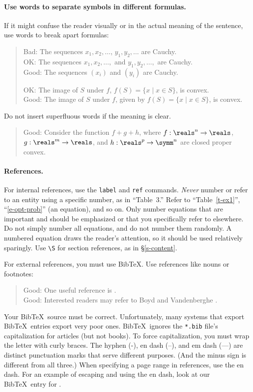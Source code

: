 \documentclass[12pt]{article}
\begin{document}
\paragraph{Use words to separate symbols in different formulas.}
If it might confuse the reader visually or in the actual
meaning of the sentence, use words to break apart formulas:
\begin{quote}
Bad: The sequences $x_1, x_2, \dots$, $y_1, y_2, \dots$ are Cauchy. \\
OK: The sequences $x_1, x_2, \dots,$ and $y_1, y_2, \dots,$ are Cauchy. \\
Good: The sequences $(x_i)$ and $(y_i)$ are Cauchy.

OK: The image of $S$ under $f$, $f(S) = \{ x \mid x \in S \}$, is convex. \\
Good: The image of $S$ under $f$, given by $f(S) = \{ x \mid x \in S \}$, is convex.
\end{quote}
Do not insert superfluous words if the meaning is clear.
\begin{quote}
Good: Consider the function $f + g + h$, where $f : \reals^n \to
\reals$, $g : \reals^m \to \reals$, and $h : \reals^p \to \symm^n$ are closed
proper convex.
\end{quote}

\paragraph{References.}
For internal references, use the \texttt{label} and \texttt{ref} commands.
\emph{Never} number or refer to an entity using a specific number,
as in ``Table~3.''
Refer to ``Table~\ref{t-ex1}'', ``\eqref{e-opt-prob}'' (an equation), and so on.
Only number equations that are important and should be emphasized or that you
specifically refer to elsewhere. Do not simply number all equations, and do not
number them randomly. A numbered equation draws the reader's attention, so it
should be used relatively sparingly. Use \verb+\S+ for section references, as in
\S\ref{s-content}.

For external references, you must use Bib\TeX. Use references like nouns or 
footnotes:
\begin{quote}
Good: One useful reference is \cite{BoV:04}. \\
Good: Interested readers may refer to Boyd and Vandenberghe \cite{BoV:04}.
\end{quote}

Your Bib\TeX\ source must be correct.  Unfortunately, many systems that export
Bib\TeX\ entries export very poor ones.  Bib\TeX\ ignores the \texttt{*.bib}
file's capitalization for articles (but not books). To force capitalization,
you must wrap the letter with curly braces.  The hyphen (-), en dash (--), and
em dash (---) are distinct punctuation marks that serve different purposes.
(And the minus sign is different from all three.) When specifying a page range
in references, use the en dash. For an example of escaping and using the en
dash, look at our Bib\TeX\ entry for \cite{Tref:2008}.
\end{document}
